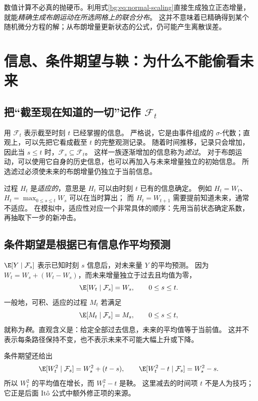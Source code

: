 数值计算不必真的抛硬币。利用式\eqref{bg:eq:normal-scaling}直接生成独立正态增量，
就能\emph{精确生成布朗运动在所选网格上的联合分布}。
这并不意味着已精确得到某个随机微分方程的解；从布朗增量更新状态的公式，仍可能产生离散误差。

\section{信息、条件期望与鞅：为什么不能偷看未来}
\label{bg:sec:information}

\subsection{把“截至现在知道的一切”记作 $\mathcal F_t$}
\label{bg:sub:filtration}

用 $\mathcal F_t$ 表示截至时刻 $t$ 已经掌握的信息。
严格说，它是由事件组成的 $\sigma$-代数；直观上，可以先把它看成截至 $t$ 的完整观测记录。
随着时间推移，记录只会增加，因此当 $s\leq t$ 时，$\mathcal F_s\subseteq\mathcal F_t$。
这样一族逐渐增加的信息称为\emph{滤过}。
对于布朗运动，可以使用它自身的历史信息，也可以再加入与未来增量独立的初始信息。
所选滤过必须使未来的布朗增量仍独立于当前信息。

过程 $H_t$ 是\emph{适应的}，意思是 $H_t$ 可以由时刻 $t$ 已有的信息确定。
例如 $H_t=W_t$、$H_t=\max_{0\leq s\leq t}W_s$ 可以在当时算出；
而 $H_t=W_{t+1}$ 需要提前知道未来，通常不适应。
在模拟中，适应性对应一个非常具体的顺序：先用当前状态确定系数，再抽取下一步的新冲击。

\subsection{条件期望是根据已有信息作平均预测}
\label{bg:sub:martingale}

$\E[Y\mid\mathcal F_s]$ 表示已知时刻 $s$ 信息后，对未来量 $Y$ 的平均预测。
因为 $W_t=W_s+(W_t-W_s)$，而未来增量独立于过去且均值为零，
\begin{equation}
  \E[W_t\mid\mathcal F_s]=W_s,
  \qquad 0\leq s\leq t.
  \label{bg:eq:w-martingale}
\end{equation}
一般地，可积、适应的过程 $M_t$ 若满足
\begin{equation}
  \E[M_t\mid\mathcal F_s]=M_s,
  \qquad 0\leq s\leq t,
  \label{bg:eq:martingale-definition}
\end{equation}
就称为\emph{鞅}。直观含义是：给定全部过去信息，未来的平均值等于当前值。
这并不表示每条路径保持不变，也不表示未来不可能大幅上升或下降。

条件期望还给出
\begin{equation}
  \E[W_t^2\mid\mathcal F_s]=W_s^2+(t-s),
  \qquad
  \E[W_t^2-t\mid\mathcal F_s]=W_s^2-s.
  \label{bg:eq:w-square-martingale}
\end{equation}
所以 $W_t^2$ 的平均值在增长，而 $W_t^2-t$ 是鞅。
这里减去的时间项 $t$ 不是人为技巧；它正是后面 It\^o 公式中额外修正项的来源。

